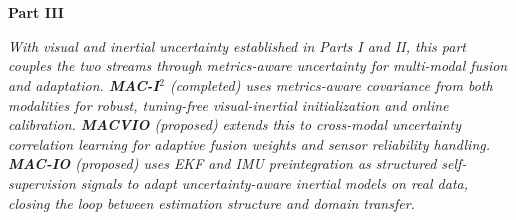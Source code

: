 \chapter*{} %
\begin{center}
    \vspace*{3.5cm} 
{\Huge \textbf{Part III} \\ [1cm]}
{\LARGE \textbf{\partIIITitle}}
\end{center}

\vspace{2cm}

\begin{center}
\textit{With visual and inertial uncertainty established in Parts I and II, this part couples the two streams through metrics-aware uncertainty for multi-modal fusion and adaptation. \textbf{MAC-I$^2$} (completed) uses metrics-aware covariance from both modalities for robust, tuning-free visual-inertial initialization and online calibration. \textbf{MACVIO} (proposed) extends this to cross-modal uncertainty correlation learning for adaptive fusion weights and sensor reliability handling. \textbf{MAC-IO} (proposed) uses EKF and IMU preintegration as structured self-supervision signals to adapt uncertainty-aware inertial models on real data, closing the loop between estimation structure and domain transfer.}
\end{center}
